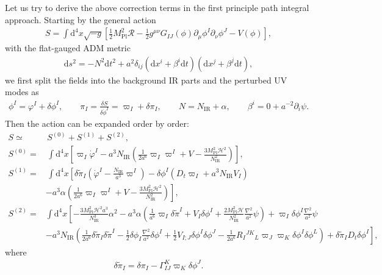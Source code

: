 \documentclass[aps, prd
, preprint
, nofootinbib 
, notitlepage
, longbibliography
]{revtex4-1}
\newcommand{\dd}{\mathrm{d}}
\newcommand{\Mpl}{M_\text{Pl}}
\newcommand{\IR}{\text{IR}}
\newcommand{\calH}{\mathcal{H}}
\newcommand{\calR}{\mathcal{R}}
\newcommand{\bae}[1]{\begin{align} #1 \end{align}}
\begin{document}
Let us try to derive the above correction terms in the first principle path integral approach.
Starting by the general action
\bae{
    S=\int\dd^4x\sqrt{-g}\left[\frac{1}{2}\Mpl^2\calR-\frac{1}{2}g^{\mu\nu}G_{IJ}(\phi)\partial_\mu\phi^I\partial_\nu\phi^J-V(\phi)\right],
}
with the flat-gauged ADM metric
\bae{
    \dd s^2=-N^2\dd t^2+a^2\delta_{ij}(\dd x^i+\beta^i\dd t)(\dd x^j+\beta^j\dd t),
}
we first split the fields into the background IR parts and the perturbed UV modes as
\bae{
    \phi^I=\varphi^I+\delta\phi^I, \qquad \pi_I=\frac{\delta S}{\delta\dot{\phi}^I}=\varpi_I+\delta\pi_I, \qquad N=N_\IR+\alpha, \qquad \beta^i=0+a^{-2}\partial_i\psi.
}
Then the action can be expanded order by order:
\bae{
    S\simeq&\, S^{(0)}+S^{(1)}+S^{(2)}, \\
    S^{(0)}=&\,\int\dd^4x\left[\varpi_I\dot{\varphi}^I-a^3N_\IR\left(\frac{1}{2a^6}\varpi_I\varpi^I+V-\frac{3\Mpl^2\calH^2}{N_\IR^2}\right)\right], \\
    S^{(1)}=&\,\int\dd^4x\left[\delta\tilde{\pi}_I\left(\dot{\varphi}^I-\frac{N_\IR}{a^3}\varpi^I\right)-\delta\phi^I\left(D_t\varpi_I+a^3N_\IR V_I\right)\right. \nonumber \\
    &\left.-a^3\alpha\left(\frac{1}{2a^6}\varpi_I\varpi^I+V-\frac{3\Mpl^2\calH^2}{N_\IR^2}\right)\right], \\
    S^{(2)}=&\int\dd^4x\left[-\frac{3\Mpl^2\calH^2a^3}{N_\IR^3}\alpha^2-a^3\alpha\left(\frac{1}{a^6}\varpi_I\delta\tilde{\pi}^I+V_I\delta\phi^I+\frac{2\Mpl^2\calH}{N_\IR^2}\frac{\nabla^2}{a^2}\psi\right)+\varpi_I\delta\phi^I\frac{\nabla^2}{a^2}\psi\right. \nonumber \\
    &\left.-a^3N_\IR\left(\frac{1}{2a^6}\delta\tilde{\pi}_I\delta\tilde{\pi}^I-\frac{1}{2}\delta\phi_I\frac{\nabla^2}{a^2}\delta\phi^I+\frac{1}{2}V_{I;J}\delta\phi^I\delta\phi^J-\frac{1}{2a^6}R_I{}^{JK}{}_L\varpi_J\varpi_K\delta\phi^I\delta\phi^L\right)+\delta\tilde{\pi}_ID_t\delta\phi^I\right],
}
where
\bae{
    \delta\tilde{\pi}_I=\delta\pi_I-\Gamma^K_{IJ}\varpi_K\delta\phi^J.
}
\end{document}
